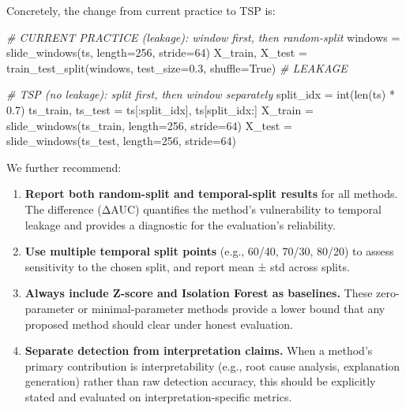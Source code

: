 \documentclass[
]{article}
\newenvironment{Shaded}{}{}
\newcommand{\BuiltInTok}[1]{\textcolor[rgb]{0.00,0.50,0.00}{#1}}
\newcommand{\CommentTok}[1]{\textcolor[rgb]{0.38,0.63,0.69}{\textit{#1}}}
\newcommand{\DecValTok}[1]{\textcolor[rgb]{0.25,0.63,0.44}{#1}}
\newcommand{\FloatTok}[1]{\textcolor[rgb]{0.25,0.63,0.44}{#1}}
\newcommand{\NormalTok}[1]{#1}
\newcommand{\OperatorTok}[1]{\textcolor[rgb]{0.40,0.40,0.40}{#1}}
\newcommand{\VariableTok}[1]{\textcolor[rgb]{0.10,0.09,0.49}{#1}}
\begin{document}
Concretely, the change from current practice to TSP is:

\begin{Shaded}
\begin{Highlighting}[]
\CommentTok{\# CURRENT PRACTICE (leakage): window first, then random{-}split}
\NormalTok{windows }\OperatorTok{=}\NormalTok{ slide\_windows(ts, length}\OperatorTok{=}\DecValTok{256}\NormalTok{, stride}\OperatorTok{=}\DecValTok{64}\NormalTok{)}
\NormalTok{X\_train, X\_test }\OperatorTok{=}\NormalTok{ train\_test\_split(windows, test\_size}\OperatorTok{=}\FloatTok{0.3}\NormalTok{, shuffle}\OperatorTok{=}\VariableTok{True}\NormalTok{)  }\CommentTok{\# LEAKAGE}

\CommentTok{\# TSP (no leakage): split first, then window separately}
\NormalTok{split\_idx }\OperatorTok{=} \BuiltInTok{int}\NormalTok{(}\BuiltInTok{len}\NormalTok{(ts) }\OperatorTok{*} \FloatTok{0.7}\NormalTok{)}
\NormalTok{ts\_train, ts\_test }\OperatorTok{=}\NormalTok{ ts[:split\_idx], ts[split\_idx:]}
\NormalTok{X\_train }\OperatorTok{=}\NormalTok{ slide\_windows(ts\_train, length}\OperatorTok{=}\DecValTok{256}\NormalTok{, stride}\OperatorTok{=}\DecValTok{64}\NormalTok{)}
\NormalTok{X\_test }\OperatorTok{=}\NormalTok{ slide\_windows(ts\_test, length}\OperatorTok{=}\DecValTok{256}\NormalTok{, stride}\OperatorTok{=}\DecValTok{64}\NormalTok{)}
\end{Highlighting}
\end{Shaded}

We further recommend:

\begin{enumerate}
\def\labelenumi{\arabic{enumi}.}
\item
  \textbf{Report both random-split and temporal-split results} for all
  methods. The difference (ΔAUC) quantifies the method's vulnerability
  to temporal leakage and provides a diagnostic for the evaluation's
  reliability.
\item
  \textbf{Use multiple temporal split points} (e.g., 60/40, 70/30,
  80/20) to assess sensitivity to the chosen split, and report mean ±
  std across splits.
\item
  \textbf{Always include Z-score and Isolation Forest as baselines.}
  These zero-parameter or minimal-parameter methods provide a lower
  bound that any proposed method should clear under honest evaluation.
\item
  \textbf{Separate detection from interpretation claims.} When a
  method's primary contribution is interpretability (e.g., root cause
  analysis, explanation generation) rather than raw detection accuracy,
  this should be explicitly stated and evaluated on
  interpretation-specific metrics.
\end{enumerate}
\end{document}
